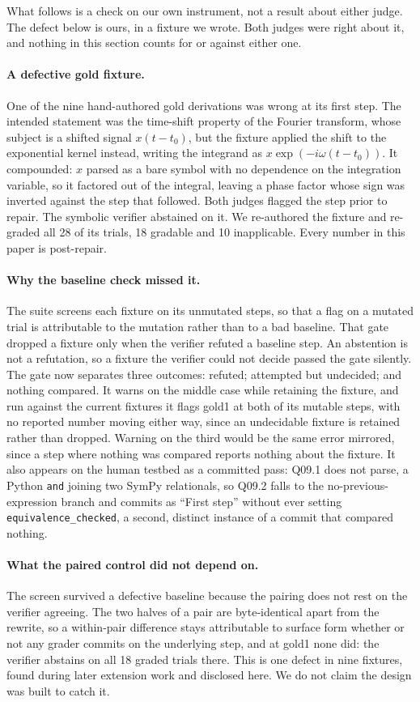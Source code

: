 What follows is a check on our own instrument, not a result about either
judge. The defect below is ours, in a fixture we wrote. Both judges were right
about it, and nothing in this section counts for or against either one.

\paragraph{A defective gold fixture.}
One of the nine hand-authored gold derivations was wrong at its first step.
The intended statement was the time-shift property of the Fourier transform,
whose subject is a shifted signal $x(t - t_0)$, but the fixture applied the
shift to the exponential kernel instead, writing the integrand as
$x \exp(-i \omega (t - t_0))$. It compounded: $x$ parsed as a bare symbol with no
dependence on the integration variable, so it factored out of the integral,
leaving a phase factor whose sign was inverted against the step that
followed. Both judges flagged the step prior to repair. The symbolic verifier
abstained on it. We re-authored the fixture and re-graded all 28 of its
trials, 18 gradable and 10 inapplicable. Every number in this paper is
post-repair.

\paragraph{Why the baseline check missed it.}
The suite screens each fixture on its unmutated steps, so that a flag on a
mutated trial is attributable to the mutation rather than to a bad baseline.
That gate dropped a fixture only when the verifier refuted a baseline step. An
abstention is not a refutation, so a fixture the verifier could not decide
passed the gate silently. The gate now separates three outcomes: refuted;
attempted but undecided; and nothing compared. It warns on the middle case
while retaining the fixture, and run against the current fixtures it flags
gold1 at both of its mutable steps, with no reported number moving either way,
since an undecidable fixture is retained rather than dropped. Warning on the third would be the same error mirrored,
since a step where nothing was compared reports nothing about the fixture. It also
appears on the human testbed as a committed pass: Q09.1 does not parse, a
Python \texttt{and} joining two SymPy relationals, so Q09.2 falls to the
no-previous-expression branch and commits as ``First step'' without ever
setting \texttt{equivalence\_checked}, a second, distinct instance of a commit
that compared nothing.

\paragraph{What the paired control did not depend on.}
The screen survived a defective baseline because the pairing does not rest on
the verifier agreeing. The two halves of a pair are byte-identical apart from
the rewrite, so a within-pair difference stays attributable to surface form
whether or not any grader commits on the underlying step, and at gold1 none
did: the verifier abstains on all 18 graded trials there. This is one defect
in nine fixtures, found during later extension work and disclosed here. We do
not claim the design was built to catch it.
